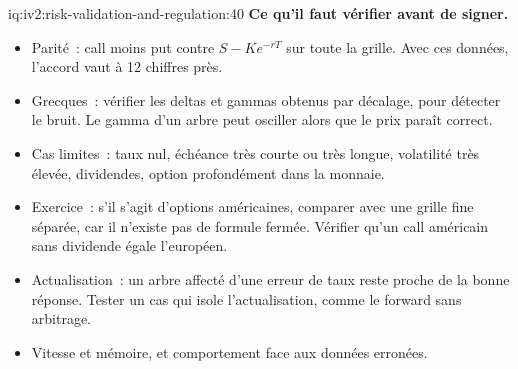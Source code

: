 \begin{solution}{iq:iv2:risk-validation-and-regulation:40}
\textbf{Ce qu'il faut vérifier avant de signer.}
\begin{itemize}
\item Parité~: call moins put contre $S - Ke^{-rT}$ sur toute la grille. Avec ces données, l'accord vaut à 12 chiffres près.
\item Grecques~: vérifier les deltas et gammas obtenus par décalage, pour détecter le bruit. Le gamma d'un arbre peut osciller alors que le prix paraît correct.
\item Cas limites~: taux nul, échéance très courte ou très longue, volatilité très élevée, dividendes, option profondément dans la monnaie.
\item Exercice~: s'il s'agit d'options américaines, comparer avec une grille fine séparée, car il n'existe pas de formule fermée. Vérifier qu'un call américain sans dividende égale l'européen.
\item Actualisation~: un arbre affecté d'une erreur de taux reste proche de la bonne réponse. Tester un cas qui isole l'actualisation, comme le forward sans arbitrage.
\item Vitesse et mémoire, et comportement face aux données erronées.
\end{itemize}

\end{solution}
